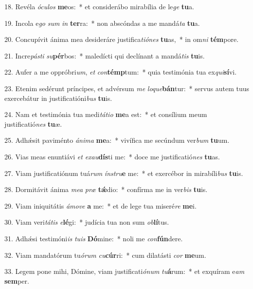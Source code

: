 18. Revéla \textit{ó}\textit{cu}\textit{los} \textbf{me}os:~*  et considerábo mirabília de le\textit{ge} \textbf{tu}a.\

19. Incola e\textit{go} \textit{sum} \textit{in} \textbf{ter}ra:~*  non abscóndas a me mandá\textit{ta} \textbf{tu}a.\

20. Concupívit ánima mea desideráre justifica\textit{ti}\textit{ó}\textit{nes} \textbf{tu}as,~*  in om\textit{ni} \textbf{tém}pore.\

21. Incre\textit{pás}\textit{ti} \textit{su}\textbf{pér}bos:~*  maledícti qui declínant a mandá\textit{tis} \textbf{tu}is.\

22. Aufer a me oppróbri\textit{um}, \textit{et} \textit{con}\textbf{témp}tum:~*  quia testimónia tua ex\textit{qui}\textbf{sí}vi.\

23. Etenim sedérunt príncipes, et advérsum \textit{me} \textit{lo}\textit{que}\textbf{bán}tur:~*  servus autem tuus exercebátur in justificatióni\textit{bus} \textbf{tu}is.\

24. Nam et testimónia tua medi\textit{tá}\textit{ti}\textit{o} \textbf{me}a est:~*  et consílium meum justificatió\textit{nes} \textbf{tu}æ.\

25. Adhǽsit paviménto \textit{á}\textit{ni}\textit{ma} \textbf{me}a:~*  vivífica me secúndum ver\textit{bum} \textbf{tu}um.\

26. Vias meas enuntiávi \textit{et} \textit{ex}\textit{au}\textbf{dís}ti me:~*  doce me justificatió\textit{nes} \textbf{tu}as.\

27. Viam justificatiónum tuá\textit{rum} \textit{ín}\textit{stru}\textbf{e} me:~*  et exercébor in mirabíli\textit{bus} \textbf{tu}is.\

28. Dormitávit ánima \textit{me}\textit{a} \textit{præ} \textbf{tǽ}dio:~*  confírma me in ver\textit{bis} \textbf{tu}is.\

29. Viam iniquitátis \textit{á}\textit{mo}\textit{ve} \textbf{a} me:~*  et de lege tua miseré\textit{re} \textbf{me}i.\

30. Viam veri\textit{tá}\textit{tis} \textit{e}\textbf{lé}gi:~*  judícia tua non sum \textit{ob}\textbf{lí}tus.\

31. Adhǽsi testimóni\textit{is} \textit{tu}\textit{is} \textbf{Dó}mine:~*  noli me \textit{con}\textbf{fún}dere.\

32. Viam mandatórum tu\textit{ó}\textit{rum} \textit{cu}\textbf{cúr}ri:~*  cum dilatásti \textit{cor} \textbf{me}um.\

33. Legem pone mihi, Dómine, viam justificati\textit{ó}\textit{num} \textit{tu}\textbf{á}rum:~*  et exquíram e\textit{am} \textbf{sem}per.\

